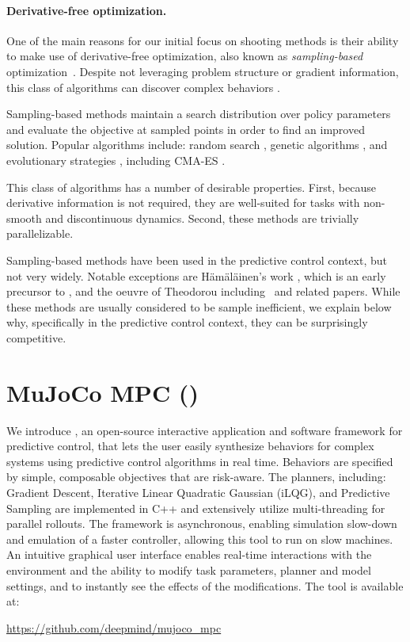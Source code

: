 \paragraph{Derivative-free optimization.}
One of the main reasons for our initial focus on shooting methods is their ability to make use of derivative-free optimization, also known as \emph{sampling-based} optimization~\cite{audet2017derivative}. Despite not leveraging problem structure or gradient information, this class of algorithms can discover complex behaviors \cite{salimans2017evolution, mania2018simple}.

Sampling-based methods maintain a search distribution over policy parameters and evaluate the objective at sampled points in order to find an improved solution. Popular algorithms include: random search \cite{matyas1965random}, genetic algorithms \cite{holland1992genetic}, and evolutionary strategies \cite{rechenberg1973evolutionsstrategie}, including CMA-ES \cite{hansen2001completely}. 

This class of algorithms has a number of desirable properties. First, because derivative information is not required, they are well-suited for tasks with non-smooth and discontinuous dynamics. Second, these methods are trivially parallelizable.

Sampling-based methods have been used in the predictive control context, but not very widely. Notable exceptions are H{\"a}m{\"a}l{\"a}inen's work \cite{hmlinen2014online, hmlinen2015online}, which is an early precursor to \app{}, and the oeuvre of Theodorou including~\cite{williams2017model} and related papers. While these methods are usually considered to be sample inefficient, we explain below why, specifically in the predictive control context, they can be surprisingly competitive.

\section{MuJoCo MPC (\app{})} \label{ps_mujoco_mpc}

We introduce \app{}, an open-source interactive application and software framework for predictive control, that lets the user easily synthesize behaviors for complex systems using predictive control algorithms in real time. Behaviors are specified by simple, composable objectives that are risk-aware. The planners, including: Gradient Descent, Iterative Linear Quadratic Gaussian (iLQG), and Predictive Sampling are implemented in C++ and extensively utilize multi-threading for parallel rollouts. The framework is asynchronous, enabling simulation slow-down and emulation of a faster controller, allowing this tool to run on slow machines. An intuitive graphical user interface enables real-time interactions with the environment and the ability to modify task parameters, planner and model settings, and to instantly see the effects of the modifications. The tool is available at:
\begin{center}
\url{https://github.com/deepmind/mujoco_mpc}
\end{center}

